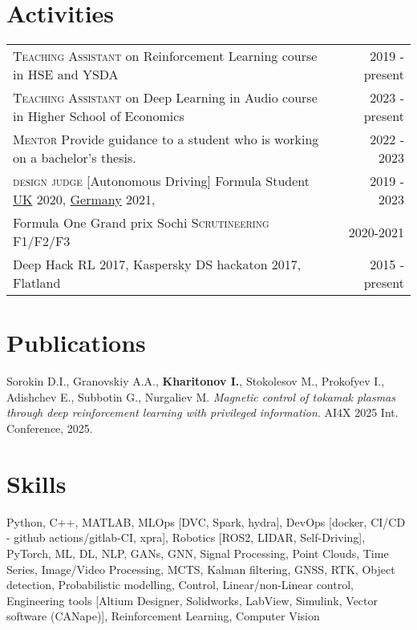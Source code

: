 \documentclass[]{resume}
\begin{document}
\section*{\sectionformat Activities}
\begin{tabular}{@{}L!{\VRule}R}
	{\textsc{Teaching Assistant}} on Reinforcement Learning course in HSE and YSDA               & 2019 - present
	\\
	{\textsc{Teaching Assistant}} on Deep Learning in Audio course in Higher School of Economics & 2023 - present
	\\
	{\textsc{Mentor}} Provide guidance to a student who is working on a bachelor's thesis.       & 2022 - 2023
	\\
	{\textsc{design judge}} [Autonomous Driving] Formula Student  \href{https://www.imeche.org/events/formula-student/team-information/fs-ai}{UK} 2020, \href{https://www.formulastudent.de/fsg/}{Germany} 2021,
	                                                                                             & 2019 - 2023
	\\
	Formula One Grand prix Sochi \textsc{Scrutineering F1/F2/F3}                                 & 2020-2021
	\\
	Deep Hack RL 2017, Kaspersky DS hackaton 2017, Flatland                                      & 2015 - present
\end{tabular}

\section*{\sectionformat Publications}
\noindent Sorokin D.I., Granovskiy A.A., \textbf{Kharitonov I.}, Stokolesov M., Prokofyev I., Adishchev E., Subbotin G., Nurgaliev M. \textit{Magnetic control of tokamak plasmas through deep reinforcement learning with privileged information}. AI4X 2025 Int. Conference, 2025.

\section*{\sectionformat Skills}
Python, C++, MATLAB, MLOps [DVC, Spark, hydra], DevOps [docker, CI/CD - github actions/gitlab-CI, xpra], Robotics [ROS2, LIDAR, Self-Driving], PyTorch, ML, DL, NLP, GANs, GNN, Signal Processing, Point Clouds, Time Series, Image/Video Processing,  MCTS, Kalman filtering, GNSS, RTK, Object detection, Probabilistic modelling, Control, Linear/non-Linear control, Engineering tools [Altium Designer, Solidworks, LabView, Simulink,  Vector software (CANape)], Reinforcement Learning, Computer Vision
\end{document}
